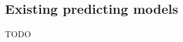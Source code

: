 \documentclass[twoside,11pt]{article}
\begin{document}
\subsection{Existing predicting models}
TODO

\newpage 


\newpage










\end{document}
